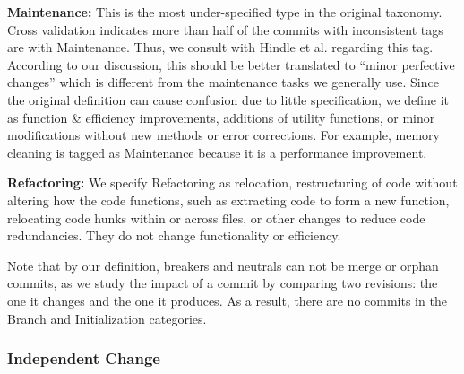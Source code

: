 \textbf{Maintenance:} This is the most under-specified type in the original taxonomy.
Cross validation indicates more than half of the commits with inconsistent tags are with Maintenance. 
Thus, we consult with Hindle et al. regarding this tag.
According to our discussion, this should be better translated to ``minor perfective changes'' which is different from the maintenance tasks we generally use.
Since the original definition can cause confusion due to little specification, we define it as function \& efficiency improvements, additions of utility functions, or minor modifications without new methods or error corrections.
For example, memory cleaning is tagged as Maintenance because it is a performance improvement. 


\textbf{Refactoring:} 
We specify Refactoring as relocation, restructuring of code without altering how the code functions, such as extracting code to form a new function, relocating code hunks within or across files, or other changes to reduce code redundancies.
They do not change functionality or efficiency.

Note that by our definition, breakers and neutrals can not be merge or orphan commits, as we study the impact of a commit by comparing two revisions: the one it changes and the one it produces.
As a result, there are no commits in the Branch and Initialization categories.


\subsubsection{Independent Change}

